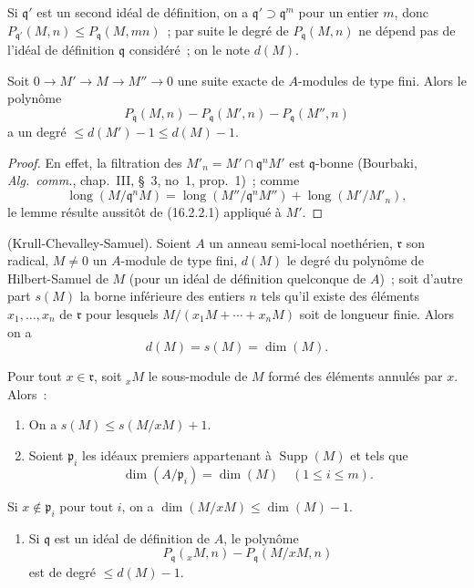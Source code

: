 Si $\mathfrak{q}'$ est un second idéal de définition, on a
$\mathfrak{q}'\supset\mathfrak{q}^m$ pour un entier $m$, donc
$P_{\mathfrak{q}'}(M,n)\leq P_{\mathfrak{q}}(M,mn)$~; par suite le degré de
$P_{\mathfrak{q}}(M,n)$ ne dépend pas de l'idéal de définition
$\mathfrak{q}$ considéré~; on le note $d(M)$.

\begin{lemma}[16.2.2.2]
\label{0.16.2.2.2-fr}
Soit $0\to M'\to M\to M''\to0$ une suite exacte de $A$-modules de type
fini. Alors le polynôme
\[
  P_{\mathfrak{q}}(M,n)-P_{\mathfrak{q}}(M',n)
  -P_{\mathfrak{q}}(M'',n)
\]
a un degré $\leq d(M')-1\leq d(M)-1$.
\end{lemma}

\begin{proof}
En effet, la filtration des
$M'_n=M'\cap\mathfrak{q}^nM'$ est $\mathfrak{q}$-bonne (Bourbaki,
\emph{Alg.~comm.}, chap.~III, \S~3, no~1, prop.~1)~; comme
\[
  \operatorname{long}(M/\mathfrak{q}^nM)
  =\operatorname{long}(M''/\mathfrak{q}^nM'')
  +\operatorname{long}(M'/M'_n),
\]
le lemme résulte aussitôt de (16.2.2.1) appliqué à $M'$.
\end{proof}

\begin{theorem}[16.2.3]
\label{0.16.2.3-fr}
\textup{(Krull-Chevalley-Samuel).}
Soient $A$ un anneau semi-local noethérien, $\mathfrak{r}$ son radical,
$M\neq0$ un $A$-module de type fini, $d(M)$ le degré du polynôme de
Hilbert-Samuel de $M$ (pour un idéal de définition quelconque de $A$)~; soit
d'autre part $s(M)$ la borne inférieure des entiers $n$ tels qu'il existe des
éléments $x_1,\ldots,x_n$ de $\mathfrak{r}$ pour lesquels
$M/(x_1M+\cdots+x_nM)$ soit de longueur finie. Alors on a
\[
  d(M)=s(M)=\dim(M).
\]
\end{theorem}

\begin{lemma}[16.2.3.1]
\label{0.16.2.3.1-fr}
Pour tout $x\in\mathfrak{r}$, soit ${}_xM$ le sous-module de $M$ formé des
éléments annulés par $x$. Alors~:
\begin{enumerate}
  \item[\rm{(i)}] On a $s(M)\leq s(M/xM)+1$.
  \item[\rm{(ii)}] Soient $\mathfrak{p}_i$ les idéaux premiers appartenant à
  $\operatorname{Supp}(M)$ et tels que
  \[
    \dim(A/\mathfrak{p}_i)=\dim(M)\quad(1\leq i\leq m).
  \]
\end{enumerate}
Si $x\notin\mathfrak{p}_i$ pour tout $i$, on a
$\dim(M/xM)\leq\dim(M)-1$.
\begin{enumerate}
  \item[\rm{(iii)}] Si $\mathfrak{q}$ est un idéal de définition de $A$, le
  polynôme
  \[
    P_{\mathfrak{q}}({}_xM,n)-P_{\mathfrak{q}}(M/xM,n)
  \]
  est de degré $\leq d(M)-1$.
\end{enumerate}
\end{lemma}

